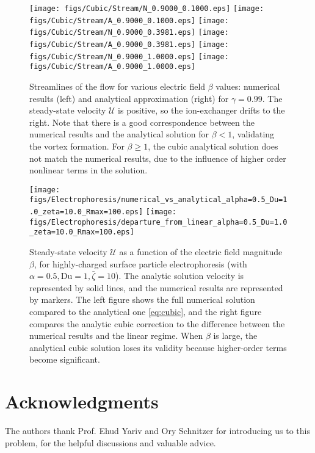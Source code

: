 \documentclass[10pt]{ijnam}
\newcommand\cU{\mathscr{U}}
\begin{document}
\begin{figure}[htbp]
    \begin{center}
	\texttt{[image: figs/Cubic/Stream/N\_0.9000\_0.1000.eps]}
	\texttt{[image: figs/Cubic/Stream/A\_0.9000\_0.1000.eps]}
	\texttt{[image: figs/Cubic/Stream/N\_0.9000\_0.3981.eps]}
	\texttt{[image: figs/Cubic/Stream/A\_0.9000\_0.3981.eps]}
	\texttt{[image: figs/Cubic/Stream/N\_0.9000\_1.0000.eps]}
	\texttt{[image: figs/Cubic/Stream/A\_0.9000\_1.0000.eps]}
        \caption{Streamlines of the flow for various electric field $\beta$ values: 
        numerical results (left) and analytical approximation (right) for 
        $\gamma = 0.99$.  The steady-state velocity $\cU$ is positive, so the
        ion-exchanger drifts to the right. 
        Note that there is a good correspondence between the numerical
        results and the analytical solution for $\beta < 1$, validating
        the vortex formation. For $\beta \ge 1$, the cubic analytical
        solution does not match the numerical results, due
        to the influence of higher order nonlinear terms in the  solution.
        }
    \label{fig:Vortex}
    \end{center}
\end{figure}

\begin{figure}[htbp]
    \begin{center}
    \texttt{[image: figs/Electrophoresis/numerical\_vs\_analytical\_alpha=0.5\_Du=1.0\_zeta=10.0\_Rmax=100.eps]}
    \texttt{[image: figs/Electrophoresis/departure\_from\_linear\_alpha=0.5\_Du=1.0\_zeta=10.0\_Rmax=100.eps]}
        \caption{Steady-state velocity $\cU$ as a function of the 
        electric field magnitude $\beta$, for highly-charged surface particle
        electrophoresis (with $\alpha = 0.5, \text{Du} = 1, \bar\zeta = 10$).
        The analytic solution velocity is represented by solid lines, 
        and the numerical results are represented by markers.
        The left figure shows the full numerical solution 
        compared to the analytical one \eqref{eq:cubic}, and
        the right figure compares the analytic cubic correction \cite{schnitzer2012cubic} 
        to the difference between the numerical results and the linear regime.
        When $\beta$ is large, the analytical cubic solution loses its validity 
        because higher-order terms become significant.}
	    \label{fig:Electrophoresis}
    \end{center}
\end{figure}

\section*{Acknowledgments}
The authors thank Prof. Ehud Yariv and Ory Schnitzer 
for introducing us to this problem, 
for the helpful discussions and valuable advice.



\end{document}
